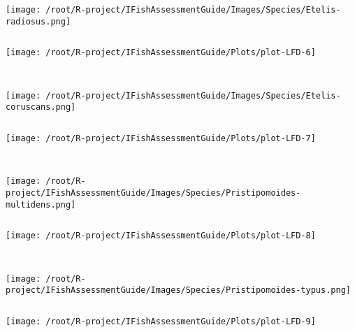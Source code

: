 \documentclass{report}\usepackage[]{graphicx}\usepackage[]{color}
\makeatletter
\def\maxwidth{ %
  \ifdim\Gin@nat@width>\linewidth
    \linewidth
  \else
    \Gin@nat@width
  \fi
}
\newenvironment{kframe}{%
 \def\at@end@of@kframe{}%
 \ifinner\ifhmode%
  \def\at@end@of@kframe{\end{minipage}}%
  \begin{minipage}{\columnwidth}%
 \fi\fi%
 \def\FrameCommand##1{\hskip\@totalleftmargin \hskip-\fboxsep
 \colorbox{shadecolor}{##1}\hskip-\fboxsep
     \hskip-\linewidth \hskip-\@totalleftmargin \hskip\columnwidth}%
 \MakeFramed {\advance\hsize-\width
   \@totalleftmargin\z@ \linewidth\hsize
   \@setminipage}}%
 {\par\unskip\endMakeFramed%
 \at@end@of@kframe}
\newenvironment{knitrout}{}{} %
\makeatother
\begin{document}
\begin{knitrout}
\begin{kframe}
\begin{verbatim}
\end{verbatim}
\end{kframe}
\texttt{[image: /root/R-project/IFishAssessmentGuide/Images/Species/Etelis-radiosus.png]}
\begin{kframe}\begin{verbatim}
\end{verbatim}
\end{kframe}
\texttt{[image: /root/R-project/IFishAssessmentGuide/Plots/plot-LFD-6]} 
\begin{kframe}\begin{verbatim}
 
\end{verbatim}
\end{kframe}
\texttt{[image: /root/R-project/IFishAssessmentGuide/Images/Species/Etelis-coruscans.png]}
\begin{kframe}\begin{verbatim}
\end{verbatim}
\end{kframe}
\texttt{[image: /root/R-project/IFishAssessmentGuide/Plots/plot-LFD-7]} 
\begin{kframe}\begin{verbatim}
 
\end{verbatim}
\end{kframe}
\texttt{[image: /root/R-project/IFishAssessmentGuide/Images/Species/Pristipomoides-multidens.png]}
\begin{kframe}\begin{verbatim}
\end{verbatim}
\end{kframe}
\texttt{[image: /root/R-project/IFishAssessmentGuide/Plots/plot-LFD-8]} 
\begin{kframe}\begin{verbatim}
 
\end{verbatim}
\end{kframe}
\texttt{[image: /root/R-project/IFishAssessmentGuide/Images/Species/Pristipomoides-typus.png]}
\begin{kframe}\begin{verbatim}
\end{verbatim}
\end{kframe}
\texttt{[image: /root/R-project/IFishAssessmentGuide/Plots/plot-LFD-9]} 
\begin{kframe}\begin{verbatim}
 

\end{verbatim}
\end{kframe}
\end{knitrout}
\end{document}
